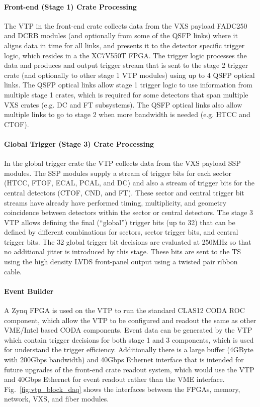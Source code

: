 \paragraph{Front-end (Stage 1) Crate Processing}
The VTP in the front-end crate collects data from the VXS payload FADC250 and DCRB modules (and optionally from some of the QSFP links) where it aligns data in time for all links, and presents it to the detector specific trigger logic, which resides in a the XC7V550T FPGA. The trigger logic processes the data and produces and output trigger stream that is sent to the stage 2 trigger crate (and optionally to other stage 1 VTP modules) using up to 4 QSFP optical links. The QSFP optical links allow stage 1 trigger logic to use information from multiple stage 1 crates, which is required for some detectors that span multiple VXS crates (e.g. DC and FT subsystems). The QSFP optical links also allow multiple links to go to stage 2 when more bandwidth is needed (e.g. HTCC and CTOF).

\paragraph{Global Trigger (Stage 3) Crate Processing}
In the global trigger crate the VTP collects data from the VXS payload SSP modules. The SSP modules supply a stream of trigger bits for each sector (HTCC, FTOF, ECAL, PCAL, and DC) and also a stream of trigger bits for the central detectors (CTOF, CND, and FT). These sector and central trigger bit streams have already have performed timing, multiplicity, and geometry coincidence between detectors within the sector or central detectors. The stage 3 VTP allows defining the final (``global'') trigger bits (up to 32) that can be defined by different combinations for sectors, sector trigger bits, and central trigger bits. The 32 global trigger bit decisions are evaluated at 250MHz so that no additional jitter is introduced by this stage. These bits are sent to the TS using the high density LVDS front-panel output using a twisted pair ribbon cable.

\paragraph{Event Builder}
A Zynq FPGA is used on the VTP to run the standard CLAS12 CODA ROC component, which allow the VTP to be configured and readout the same as other VME/Intel based CODA components. Event data can be generated by the VTP which contain trigger decisions for both stage 1 and 3 components, which is used for understand the trigger efficiency. Additionally there is a large buffer (4GByte with 200Gbps bandwidth) and 40Gbps Ethernet interface that is intended for future upgrades of the front-end crate readout system, which would use the VTP and 40Gbps Ethernet for event readout rather than the VME interface. Fig.~\ref{fig:vtp_block_daq} shows the interfaces between the FPGAs, memory, network, VXS, and fiber modules.

